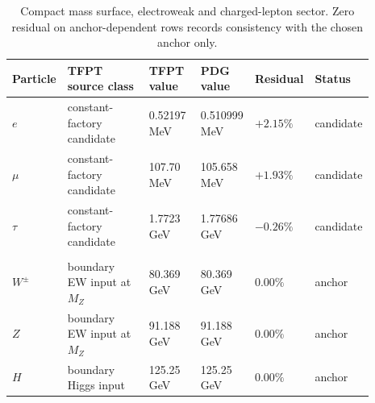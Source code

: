 \documentclass[11pt,a4paper]{article}
\theoremstyle{definition}
\theoremstyle{remark}
\begin{document}
\begin{table}[p]
\centering
\scriptsize
\setlength{\tabcolsep}{3pt}
\begin{tabularx}{\linewidth}{@{}>{\raggedright\arraybackslash}p{0.10\linewidth}>{\raggedright\arraybackslash}p{0.27\linewidth}>{\raggedleft\arraybackslash}p{0.15\linewidth}>{\raggedleft\arraybackslash}p{0.15\linewidth}>{\raggedleft\arraybackslash}p{0.10\linewidth}>{\raggedright\arraybackslash}p{0.12\linewidth}@{}}
\toprule
Particle & TFPT source class & TFPT value & PDG value & Residual & Status \\
\midrule
$e$ & constant-factory candidate & \num{0.52197} MeV & \num{0.510999} MeV & $+2.15\%$ & candidate \\
$\mu$ & constant-factory candidate & \num{107.70} MeV & \num{105.658} MeV & $+1.93\%$ & candidate \\
$\tau$ & constant-factory candidate & \num{1.7723} GeV & \num{1.77686} GeV & $-0.26\%$ & candidate \\
\midrule
\multicolumn{6}{@{}l}{\textit{Calibration surface (anchor-dependent; zero residual = anchor consistency, not prediction):}} \\
$W^\pm$ & boundary EW input at $M_Z$ & \num{80.369} GeV & \num{80.369} GeV & $0.00\%$ & anchor \\
$Z$ & boundary EW input at $M_Z$ & \num{91.188} GeV & \num{91.188} GeV & $0.00\%$ & anchor \\
$H$ & boundary Higgs input & \num{125.25} GeV & \num{125.25} GeV & $0.00\%$ & anchor \\
\bottomrule
\end{tabularx}
\caption{Compact mass surface, electroweak and charged-lepton sector. Zero residual on anchor-dependent rows records consistency with the chosen anchor only.}
\label{tab:sm-mass-ledger-ew}
\end{table}
\end{document}
